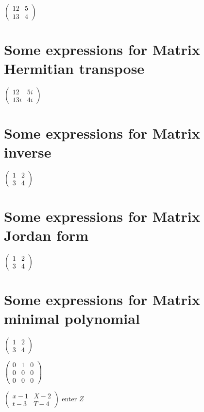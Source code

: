 \documentclass{article}
\begin{document}
$\left( 
\begin{array}{cc}
12 & 5 \\ 
13 & 4%
\end{array}%
\right) $

\section{Some expressions for Matrix Hermitian transpose}

$\left( 
\begin{array}{cc}
12 & 5i \\ 
13i & 4i%
\end{array}%
\right) $

\section{Some expressions for Matrix inverse}

$\left( 
\begin{array}{cc}
1 & 2 \\ 
3 & 4%
\end{array}%
\right) $

\section{Some expressions for Matrix Jordan form}

$\left( 
\begin{array}{cc}
1 & 2 \\ 
3 & 4%
\end{array}%
\right) $

\section{Some expressions for Matrix minimal polynomial}

$\left( 
\begin{array}{cc}
1 & 2 \\ 
3 & 4%
\end{array}%
\right) $

$\left( 
\begin{array}{ccc}
0 & 1 & 0 \\ 
0 & 0 & 0 \\ 
0 & 0 & 0%
\end{array}%
\right) $

$\left( 
\begin{array}{cc}
x-1 & X-2 \\ 
t-3 & T-4%
\end{array}%
\right) $ enter $Z$
\end{document}
